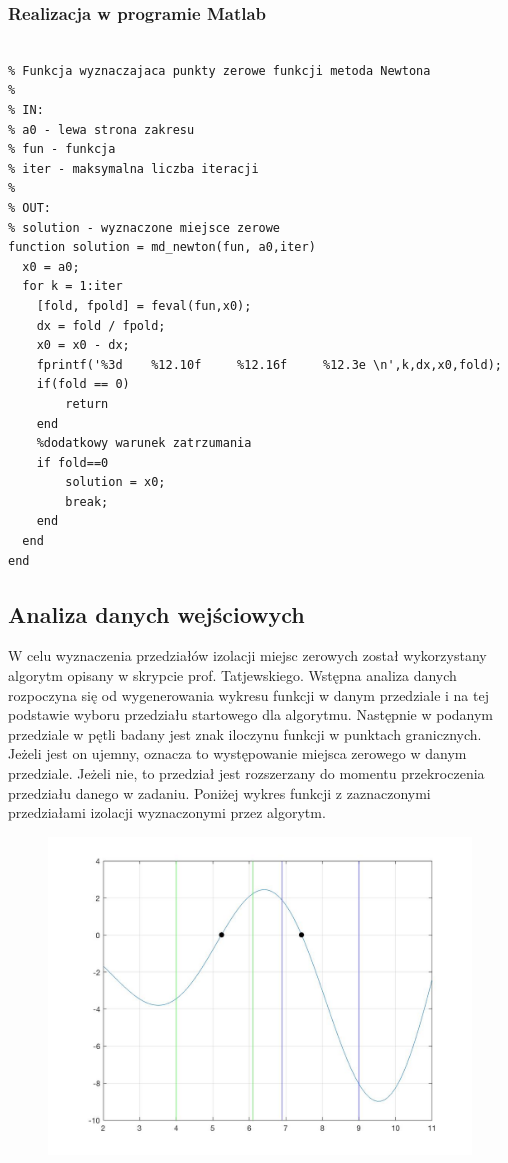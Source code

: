 \documentclass[11pt, oneside]{article}   	%
\begin{document}
\subsubsection{Realizacja w programie Matlab}
\begin{lstlisting}[caption=Implementacja metody Newtona]

% Funkcja wyznaczajaca punkty zerowe funkcji metoda Newtona
%
% IN:
% a0 - lewa strona zakresu
% fun - funkcja 
% iter - maksymalna liczba iteracji
%
% OUT:
% solution - wyznaczone miejsce zerowe
function solution = md_newton(fun, a0,iter)
  x0 = a0; 
  for k = 1:iter
    [fold, fpold] = feval(fun,x0); 
    dx = fold / fpold; 
    x0 = x0 - dx;
    fprintf('%3d	%12.10f     %12.16f     %12.3e \n',k,dx,x0,fold);
    if(fold == 0)
        return
    end
    %dodatkowy warunek zatrzumania
	if fold==0 
        solution = x0;
        break; 
    end
  end
end

\end{lstlisting}


\subsection{Analiza danych wejściowych}
W celu wyznaczenia przedziałów izolacji miejsc zerowych został wykorzystany algorytm opisany w skrypcie prof. Tatjewskiego. Wstępna analiza danych rozpoczyna się od wygenerowania wykresu funkcji w danym przedziale i na tej podstawie wyboru przedziału startowego dla algorytmu. Następnie w podanym przedziale w pętli badany jest znak iloczynu funkcji w punktach granicznych. Jeżeli jest on ujemny, oznacza to występowanie miejsca zerowego w danym przedziale. Jeżeli nie, to przedział jest rozszerzany do momentu przekroczenia przedziału danego w zadaniu. 
Poniżej wykres funkcji z zaznaczonymi przedziałami izolacji wyznaczonymi przez algorytm. 

\begin{figure}[h]
\includegraphics[width=\textwidth]{figure1.jpg}
\end{figure}
\end{document}
